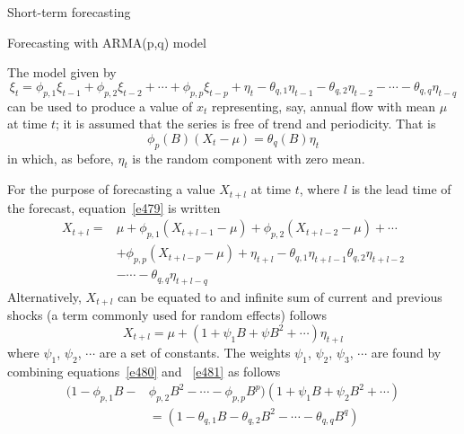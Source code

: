\documentclass[8pt]{beamer}
\renewcommand{\emph}[1]{\textcolor{myorange}{#1}}
\begin{document}
 \begin{frame}{Short-term forecasting}
    \begin{block}{Forecasting with ARMA(p,q) model}
    \end{block}
The model given by     
     \begin{equation}
            \xi_t = \phi_{p,1} \xi_{t-1} + \phi_{p,2} \xi_{t-2} + \cdots + \phi_{p,p} \xi_{t-p} + \eta_t - \theta_{q,1} \eta_{t-1} - \theta_{q,2} \eta_{t-2}-\cdots- \theta_{q,q} \eta_{t-q} 
            \label{e427}
        \end{equation}
        can be used to produce a value of $x_t$ representing, say, \emph{annual flow} with \emph{mean} $\mu$ at time $t$; it is assumed that the series is free of \emph{trend} and \emph{periodicity}. That is
     \begin{equation}
         \phi_p (B) (X_t - \mu) = \theta_q (B) \eta_t
            \label{e479}
        \end{equation}
        in which, as before, $\eta_t$ is the \emph{random component} with zero mean. 

        For the purpose of forecasting a value $X_{t+l}$ at time $t$, where $l$ is the lead time of the forecast, equation~\ref{e479} is written
     \begin{equation}
         \begin{aligned}
             X_{t+l} = &\mu + \phi_{p,1} (X_{t+l-1} - \mu) + \phi_{p,2} (X_{t+l-2} - \mu) + \cdots \\
                       &+\phi_{p,p} (X_{t+l-p} - \mu) + \eta_{t+l} -\theta_{q,1} \eta_{t+l-1} \theta_{q,2} \eta_{t+l-2}\\
                       &- \cdots - \theta_{q,q} \eta_{t+l-q}
         \end{aligned}
            \label{e480}
        \end{equation}
        Alternatively, $X_{t+l}$ can be equated to and infinite sum of current and previous shocks (a term commonly used for random effects) follows
     \begin{equation}
         X_{t+l} = \mu + (1+ \psi_1 B + \psi B^2 + \cdots) \eta_{t+l}
            \label{e481}
        \end{equation}
        where $\psi_1$, $\psi_2$, $\cdots$ are a set of constants. The weights $\psi_1$, $\psi_2$, $\psi_3$, $\cdots$ are found by combining equations~\ref{e480} and ~\ref{e481} as follows
     \begin{equation}
         \begin{aligned}
             (1-\phi_{p,1} B - &\phi_{p,2} B^2 - \cdots - \phi_{p,p} B^p) (1+ \psi_1 B + \psi_2 B^2 + \cdots) \\
                               &= (1- \theta_{q,1} B - \theta_{q,2}B^2 - \cdots - \theta_{q,q} B^q)
         \end{aligned}
            \label{e482}
        \end{equation}
\end{frame}
 
\end{document}
